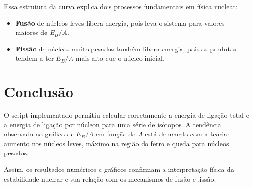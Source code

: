 \documentclass[12pt,a4paper]{article}
\begin{document}
Essa estrutura da curva explica dois processos fundamentais em f\'isica nuclear:
\begin{itemize}
	\item \textbf{Fus\~ao} de n\'ucleos leves libera energia, pois leva o sistema para valores maiores de $E_B/A$.
	\item \textbf{Fiss\~ao} de n\'ucleos muito pesados tamb\'em libera energia, pois os produtos tendem a ter $E_B/A$ mais alto que o n\'ucleo inicial.
\end{itemize}

\section{Conclus\~ao}
O script implementado permitiu calcular corretamente a energia de liga\c{c}\~ao total e a energia de liga\c{c}\~ao por n\'ucleon para uma s\'erie de is\'otopos. A tend\^encia observada no gr\'afico de $E_B/A$ em fun\c{c}\~ao de $A$ est\'a de acordo com a teoria: aumento nos n\'ucleos leves, m\'aximo na regi\~ao do ferro e queda para n\'ucleos pesados.

Assim, os resultados num\'ericos e gr\'aficos confirmam a interpreta\c{c}\~ao f\'isica da estabilidade nuclear e sua rela\c{c}\~ao com os mecanismos de fus\~ao e fiss\~ao.
\end{document}
